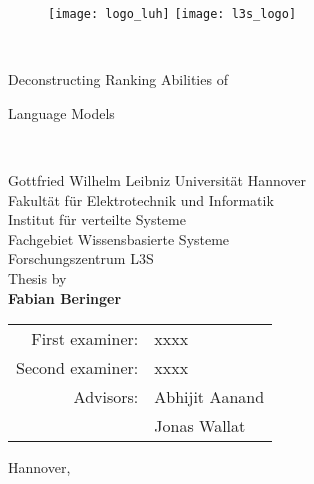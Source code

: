 \thispagestyle{empty}

{\sffamily
	\begin{figure}
		\texttt{[image: logo\_luh]}
		\hfill
		\texttt{[image: l3s\_logo]}
	\end{figure}
	\begin{center}
		\mbox{} \\
		\vspace{1.5cm}
		\huge{Deconstructing Ranking Abilities of 
		
		Language Models}\\
		\vspace{1.8cm}
		{\large
		    Gottfried Wilhelm Leibniz Universität Hannover\\
		    Fakultät für Elektrotechnik und Informatik\\
		    Institut für verteilte Systeme \\
		    Fachgebiet Wissensbasierte Systeme \\
		    Forschungszentrum L3S \\
		    \vspace{1.8cm}
		    Thesis by \\
		    \textbf{Fabian Beringer} \\
		    \vspace{1.8cm}
			\begin{tabular}{rl}
			    First examiner: 	&  xxxx\\
			    Second examiner: 	&  xxxx\\
			    Advisors: & Abhijit Aanand \\
			              & Jonas Wallat   
			\end{tabular}
		    \vfill
		    Hannover, \handindate 
			}
	\end{center}
}
\newpage